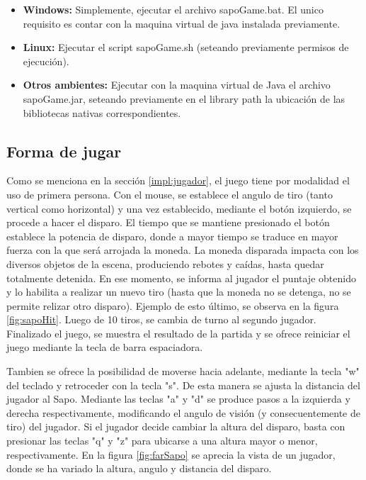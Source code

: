 \documentclass{acm_proc_article-sp}
\begin{document}
\begin{itemize}
 \item \textbf{Windows:} Simplemente, ejecutar el archivo sapoGame.bat. El unico requisito es contar con la maquina virtual de java instalada previamente.
\item \textbf{Linux:} Ejecutar el script sapoGame.sh (seteando previamente permisos de ejecuci\'on).
\item \textbf{Otros ambientes:} Ejecutar con la maquina virtual de Java el archivo sapoGame.jar, seteando previamente en el library path la ubicaci\'on de las bibliotecas nativas correspondientes.
\end{itemize}
 

\subsection{Forma de jugar}
Como se menciona en la secci\'on \ref{impl:jugador}, el juego tiene por modalidad el uso de primera persona. Con el mouse, se establece el angulo de tiro (tanto vertical como horizontal) y una vez establecido, mediante el bot\'on izquierdo, se procede a hacer el disparo. El tiempo que se mantiene presionado el bot\'on establece la potencia de disparo, donde a mayor tiempo se traduce en mayor fuerza con la que ser\'a arrojada la moneda. La moneda disparada impacta con los diversos objetos de la escena, produciendo rebotes y ca\'idas, hasta quedar totalmente detenida. En ese momento, se informa al jugador el puntaje obtenido y lo habilita a realizar un nuevo tiro (hasta que la moneda no se detenga, no se permite relizar otro disparo). Ejemplo de esto \'ultimo, se observa en la figura \ref{fig:sapoHit}. Luego de 10 tiros, se cambia de turno al segundo jugador. Finalizado el juego, se muestra el resultado de la partida y se ofrece reiniciar el juego mediante la tecla de barra espaciadora.

Tambien se ofrece la posibilidad de moverse hacia adelante, mediante la tecla "w" del teclado y retroceder con la tecla "s". De esta manera se ajusta la distancia del jugador al Sapo. Mediante las teclas "a" y "d" se produce pasos a la izquierda y derecha respectivamente, modificando el angulo de visi\'on (y consecuentemente de tiro) del jugador.
Si el jugador decide cambiar la altura del disparo, basta con presionar las teclas "q" y "z" para ubicarse a una altura mayor o menor, respectivamente. En la figura \ref{fig:farSapo} se aprecia la vista de un jugador, donde se ha variado la altura, angulo y distancia del disparo.
\end{document}

